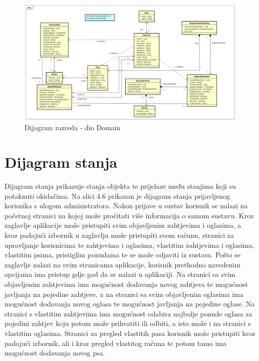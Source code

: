 			\begin{figure}[htb]
				\centering
				\includegraphics[width=15cm]{slike/Dijagram razreda - Domain}
				\caption{Dijagram razreda - dio Domain}
				\label{fig:Class-Diagram}
			\end{figure}
	
			\eject
		
		\section{Dijagram stanja}
			
			
			
			
			Dijagram stanja prikazuje stanja objekta te prijelaze među stanjima koji su potaknuti okidačima. Na slici 4.6 prikazan je dijagram stanja prijavljenog korisnika s ulogom administratora. Nakon prijave u sustav korisnik se nalazi na početnoj stranici na kojoj može pročitati više informacija o samom sustavu. Kroz zaglavlje aplikacije može pristupiti svim objavljenim zahtjevima i oglasima, a kroz padajući izbornik u zaglavlju može pristupiti svom računu, stranici za upravljanje korisnicima te zahtjevima i oglasima, vlastitim zahtjevima i oglasima, vlastitim psima, pristiglim ponudama te se može odjaviti iz sustava. Pošto se zaglavlje nalazi na svim stranicama aplikacije, korisnik prethodno navedenim opcijama ima pristup gdje god da se nalazi u aplikaciji. Na stranici sa svim objavljenim zahtjevima ima mogućnost dodavanja novog zahtjeva te mogućnost javljanja na pojedine zahtjeve, a na stranici sa svim objavljenim oglasima ima mogućnost dodavanja novog oglasa te mogućnost javljanja na pojedine oglase. Na stranici s vlastitim zahtjevima ima mogućnost odabira najbolje ponude oglasa za pojedini zahtjev koju potom može prihvatiti ili odbiti, a isto može i na stranici s vlastitim oglasima. Stranici za pregled vlastitih pasa korisnik može pristupiti kroz padajući izbornik, ali i kroz pregled vlastitog računa te potom tamo ima mogućnost dodavanja novog psa.
			
